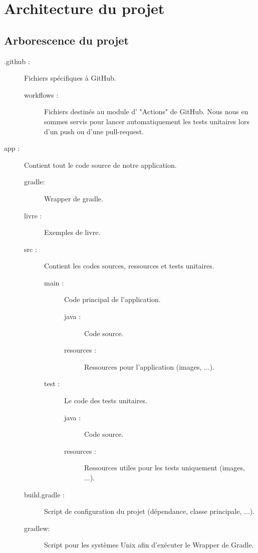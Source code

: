 \chapter{Architecture du projet}

	\section{Arborescence du projet}
		\label{sec:arborescenceProjet}
		\begin{description}
			\item[.github :]{Fichiers spécifiques à GitHub.}
			\begin{description}
				\item[workflows :]{Fichiers destinés au module d' "Actions" de GitHub. Nous nous en sommes servis pour lancer automatiquement les tests unitaires lors d'un push ou d'une pull-request.}
			\end{description}
			\item[app :]{Contient tout le code source de notre application.}
			\begin{description}
				\item[gradle:]{Wrapper de gradle.}
				\item[livre :]{Exemples de livre.}
				\item[src :]{Contient les codes sources, ressources et tests unitaires.}
				\begin{description}
					\item[main :]{Code principal de l'application.}
					\begin{description}
						\item[java :]{Code source.}
						\item[resources :]{Ressources pour l'application (images, ...).}
					\end{description}
					\item[test :]{Le code des tests unitaires.}
					\begin{description}
						\item[java :]{Code source.}
						\item[resources :]{Ressources utiles pour les tests uniquement (images, ...).}
					\end{description}
				\end{description}
				\item[build.gradle :]{Script de configuration du projet (dépendance, classe principale, ...).}
				\item[gradlew:]{Script pour les systèmes Unix afin d'exécuter le Wrapper de Gradle.}

\end{description}
\end{description}
